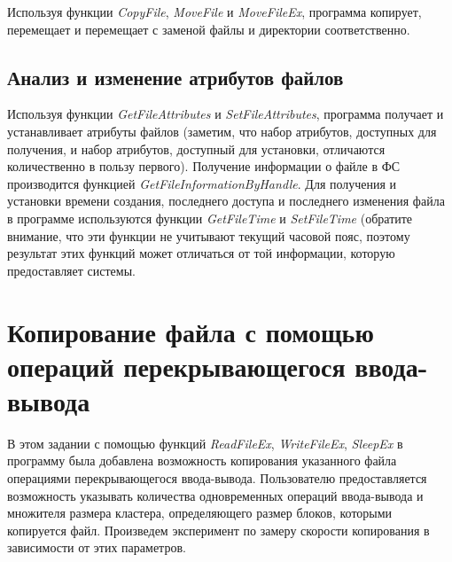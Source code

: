 \documentclass[a4paper,14pt]{extarticle}
\newcommand{\Code}[1]{\textit{#1}}
\begin{document}
Используя функции \Code{CopyFile}, \Code{MoveFile} и \Code{MoveFileEx},
программа копирует, перемещает и перемещает с заменой файлы и директории
соответственно.



\subsection{Анализ и изменение атрибутов файлов}

Используя функции \Code{GetFileAttributes} и \Code{SetFileAttributes},
программа получает и устанавливает атрибуты файлов (заметим, что набор
атрибутов, доступных для получения, и набор атрибутов, доступный для установки,
отличаются количественно в пользу первого). Получение информации о файле в ФС
производится функцией \Code{GetFileInformationByHandle}. Для получения и
установки времени создания, последнего доступа и последнего изменения файла в
программе используются функции \Code{GetFileTime} и \Code{SetFileTime}
(обратите внимание, что эти функции не учитывают текущий часовой пояс, поэтому
результат этих функций может отличаться от той информации, которую
предоставляет системы.



\clearpage


\section{Копирование файла с помощью операций перекрывающегося ввода-вывода}

В этом задании с помощью функций \Code{ReadFileEx}, \Code{WriteFileEx},
\Code{SleepEx} в программу была добавлена возможность копирования указанного
файла операциями перекрывающегося ввода-вывода. Пользователю предоставляется
возможность указывать количества одновременных операций ввода-вывода и
множителя размера кластера, определяющего размер блоков, которыми копируется
файл. Произведем эксперимент по замеру скорости копирования
в зависимости от этих параметров.
\end{document}
